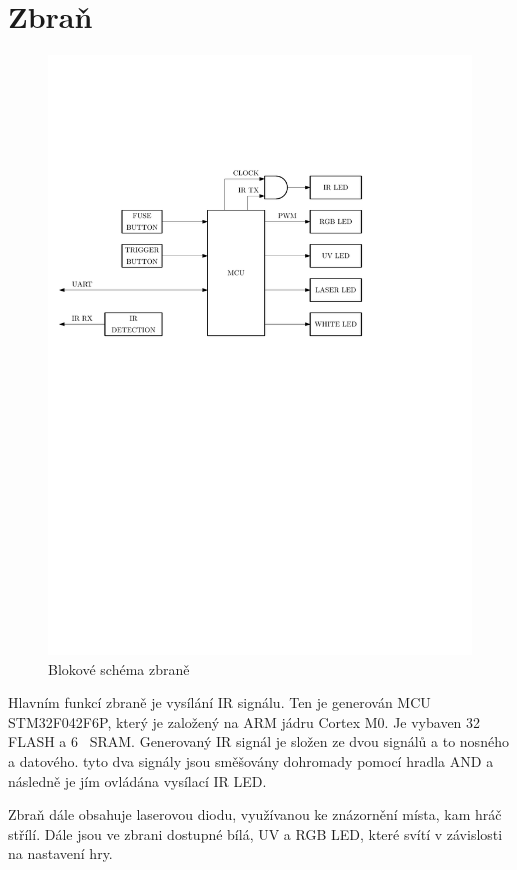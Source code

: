 \section{Zbraň}
\begin{figure}[H]
    \begin{center}
        \includegraphics[width=\textwidth]{img/gun}
    \end{center}
    \caption{Blokové schéma zbraně}
\end{figure}
Hlavním funkcí zbraně je vysílání IR signálu. Ten je generován MCU STM32F042F6P, který je založený na ARM jádru Cortex M0. Je vybaven 32~ FLASH a 6~ SRAM. Generovaný IR signál je složen ze dvou signálů a to nosného a datového. tyto dva signály jsou směšovány dohromady pomocí hradla AND a následně je jím ovládána vysílací IR LED.

Zbraň dále obsahuje laserovou diodu, využívanou ke znázornění místa, kam hráč střílí. Dále jsou ve zbrani dostupné bílá, UV a RGB LED, které svítí v závislosti na nastavení hry.


